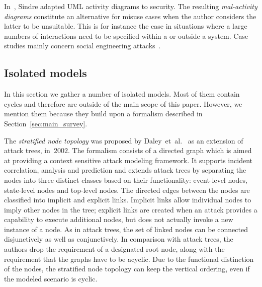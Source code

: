 \documentclass[a4paper]{article}
\begin{document}
In~\cite{Sind}, Sindre adapted UML activity diagrams to security. The resulting 
\emph{mal-activity diagrams} constitute an alternative for misuse cases when 
the author considers the latter to be unsuitable. This is for instance the case 
in situations where a large numbers of interactions need to be specified within 
a or outside a system. Case studies mainly concern social engineering 
attacks~\cite{KarpatiIJSSE12}. 

\subsection{Isolated models}
\label{sec:isolated_models}

In this section we gather a number of isolated models. Most of them contain 
cycles and therefore are outside of the main scope of this paper. However, we
mention them because they build upon a formalism described in 
Section~\ref{sec:main_survey}.

The \emph{stratified node topology} was proposed by Daley~et~al.~\cite{DaLaDa} 
as an extension of attack trees, in~$2002$. The  formalism consists of a
directed graph which is aimed at providing a context  sensitive attack modeling
framework. It supports incident correlation, analysis  and prediction and
extends attack trees by separating the nodes into three  distinct classes based
on their functionality: event-level nodes,  state-level nodes and top-level
nodes. The directed edges between the nodes are  classified into implicit and
explicit links. Implicit links allow individual  nodes to imply other nodes in
the tree; explicit links are created when an  attack provides a capability to
execute additional nodes, but does not actually  invoke a new instance of a
node. As in attack trees, the set of linked nodes  can be connected
disjunctively as well as conjunctively. In comparison with  attack trees, the
authors drop the requirement of a designated root node, along  with the
requirement that the graphs have to be acyclic. Due to the functional 
distinction of the nodes, the stratified node topology can keep the vertical 
ordering, even if the modeled scenario is cyclic.
\end{document}
